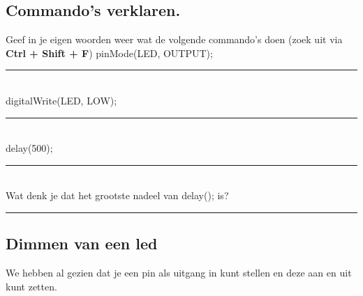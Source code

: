 

\subsection{Commando's verklaren.}

Geef in je eigen woorden weer wat de volgende commando’s doen (zoek uit via  \colorbox{mygray}{\textbf{Ctrl + Shift + F}})
\textcolor{BurntOrange}{pinMode}(LED, \textcolor{BlueGreen}{OUTPUT});\\
\vspace{1cm}
\hrule
~\\    
\vspace{1cm}
\textcolor{BurntOrange}{digitalWrite}(LED, \textcolor{BlueGreen}{LOW});\\
\vspace{1cm}
\hrule
~\\    
\vspace{0.8cm}
\textcolor{BurntOrange}{delay}(500);
\vspace{1cm}
\hrule
~\\    
Wat denk je dat het grootste nadeel van \textcolor{BurntOrange}{delay}();  is?
\vspace{1cm}
\hrule

\subsection{Dimmen van een led}

We hebben al gezien dat je een pin als uitgang in kunt stellen en deze aan en uit kunt zetten.

